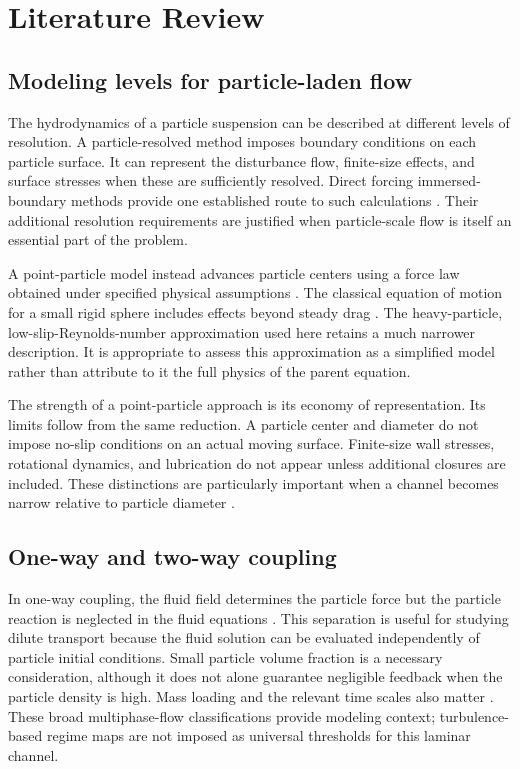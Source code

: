 \chapter{Literature Review}\label{ch:literature}

\section{Modeling levels for particle-laden flow}
The hydrodynamics of a particle suspension can be described at different
levels of resolution. A particle-resolved method imposes boundary conditions
on each particle surface. It can represent the disturbance flow, finite-size
effects, and surface stresses when these are sufficiently resolved. Direct
forcing immersed-boundary methods provide one established route to such
calculations \citep{uhlmann2005,mittal2005}. %
 Their additional resolution requirements
are justified when particle-scale flow is itself an essential part of the
problem.

A point-particle model instead advances particle centers using a force law
obtained under specified physical assumptions \citep{subramaniam2013}. %
 The classical equation of
motion for a small rigid sphere includes effects beyond steady drag
\citep{maxey1983}. The heavy-particle, low-slip-Reynolds-number approximation
used here retains a much narrower description. It is appropriate to assess
this approximation as a simplified model rather than attribute to it the
full physics of the parent equation.

The strength of a point-particle approach is its economy of representation.
Its limits follow from the same reduction. A particle center and diameter
do not impose no-slip conditions on an actual moving surface. Finite-size
wall stresses, rotational dynamics, and lubrication do not appear unless
additional closures are included. These distinctions are particularly
important when a channel becomes narrow relative to particle diameter
\citep{clift1978}.

\section{One-way and two-way coupling}
In one-way coupling, the fluid field determines the particle force but the
particle reaction is neglected in the fluid equations \citep{balachandar2010,elghobashi1994}. %
 This separation is
useful for studying dilute transport because the fluid solution can be
evaluated independently of particle initial conditions. Small particle
volume fraction is a necessary consideration, although it does not alone
guarantee negligible feedback when the particle density is high. Mass
loading and the relevant time scales also matter
\citep{balachandar2010,subramaniam2013}. These broad multiphase-flow
classifications provide modeling context; turbulence-based regime maps
are not imposed as universal thresholds for this laminar channel. %

